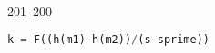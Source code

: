 201~200~\documentclass{article}
\begin{document}
\begin{lstlisting}[language=Python, caption = Cracking private key Chall 3]
	                                                                        	                                                                    	                                	                    	                    	                        	                        	                    	                                                                	                	                                                                    	                    							                                                                                                                                                                                                    		                                                                                                                        				    			                                            k = F((h(m1)-h(m2))/(s-sprime))


\end{lstlisting}
\end{document}
